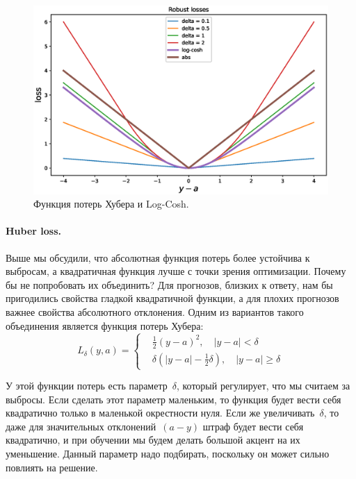 \documentclass[12pt,fleqn]{article}
\begin{document}
\begin{figure}[t]
    \centering
    \includegraphics[width=1.0\textwidth]{pics/robust_losses.eps}
    \caption{Функция потерь Хубера и Log-Cosh.}
    \label{fig:robust_losses}
\end{figure}

\paragraph{Huber loss.}

Выше мы обсудили, что абсолютная функция потерь более устойчива к выбросам,
а квадратичная функция лучше с точки зрения оптимизации.
Почему бы не попробовать их объединить?
Для прогнозов, близких к ответу, нам бы пригодились свойства гладкой квадратичной функции,
а для плохих прогнозов важнее свойства абсолютного отклонения.
Одним из вариантов такого объединения является функция потерь Хубера:
\[
    L_\delta(y, a)
    =
    \left\{
    \begin{aligned}
        &\frac12 (y - a)^2, \quad |y - a| < \delta \\
        &\delta \left(
            |y - a| - \frac12 \delta
        \right), \quad |y - a| \geq \delta
    \end{aligned}
    \right.
\]

У этой функции потерь есть параметр~$\delta$, который регулирует, что мы считаем за выбросы.
Если сделать этот параметр маленьким, то функция будет вести себя квадратично только в маленькой окрестности нуля.
Если же увеличивать~$\delta$, то даже для значительных отклонений~$(a - y)$ штраф будет вести себя квадратично,
и при обучении мы будем делать большой акцент на их уменьшение.
Данный параметр надо подбирать, поскольку он может сильно повлиять на решение.
\end{document}
